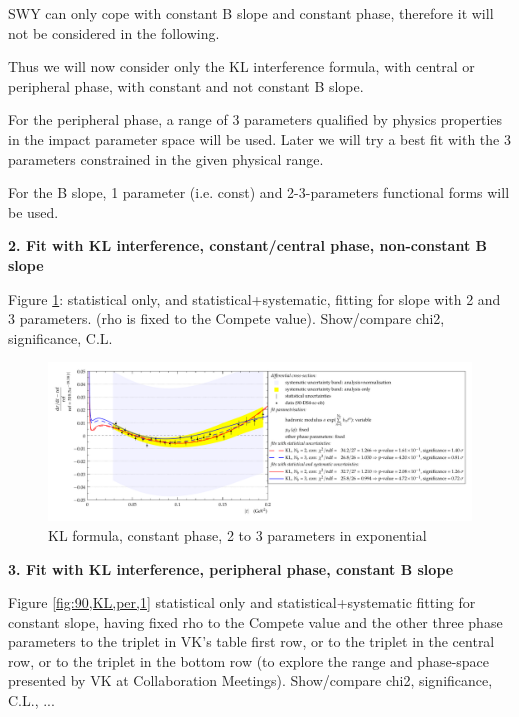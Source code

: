 SWY can only cope with constant B slope and constant phase, therefore it will not be
considered in the following.

Thus we will now consider only the KL interference formula, with central or peripheral
phase, with constant and not constant B slope.

For the peripheral phase, a range of 3 parameters qualified by physics properties in the impact
parameter space will be used. Later we will try a best fit with the 3 parameters constrained in
the given physical range.

For the B slope, 1 parameter (i.e. const) and 2-3-parameters functional forms will be used.

{\bf 2. Fit with KL interference, constant/central phase, non-constant B slope}

Figure \ref{fig:90,KL,con,2-3}: statistical only, and statistical+systematic, fitting for slope with 2 and 3 parameters. (rho is
fixed to the Compete value). Show/compare chi2, significance, C.L.

\begin{figure}
\begin{center}
\includegraphics[width=18cm]{simone/90/KL,con,2-3,stat-stat+syst.pdf}
\vskip-3mm
\caption{KL formula, constant phase, 2 to 3 parameters in exponential}
\label{fig:90,KL,con,2-3}
\end{center}
\end{figure}

{\bf 3. Fit with KL interference, peripheral phase, constant B slope}

Figure \ref{fig:90,KL,per,1}
statistical only and statistical+systematic fitting for constant slope, having fixed rho to the
Compete value and the other three phase parameters to the triplet in VK’s table first
row, or to the triplet in the central row, or to the triplet in the bottom row (to explore the
range and phase-space presented by VK at Collaboration Meetings).
Show/compare chi2, significance, C.L., ...

